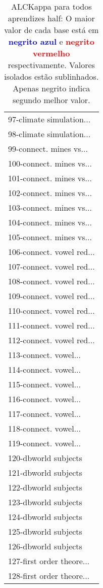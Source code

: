 \begin{table}[h]
\caption{ALCKappa para todos aprendizes half: O maior valor de cada base está em \textcolor{blue}{\textbf{negrito azul}} e \textcolor{red}{\textbf{negrito vermelho}} respectivamente. Valores isolados estão sublinhados. Apenas negrito indica segundo melhor valor.}
\begin{center}\begin{tabular}{l}
 & \\ \hline 97-climate simulation... &  \\
98-climate simulation... &  \\
99-connect. mines vs... &  \\
100-connect. mines vs... &  \\
101-connect. mines vs... &  \\
102-connect. mines vs... &  \\
103-connect. mines vs... &  \\ \hline
104-connect. mines vs... &  \\
105-connect. mines vs... &  \\
106-connect. vowel red... &  \\
107-connect. vowel red... &  \\
108-connect. vowel red... &  \\
109-connect. vowel red... &  \\
110-connect. vowel red... &  \\ \hline
111-connect. vowel red... &  \\
112-connect. vowel red... &  \\
113-connect. vowel... &  \\
114-connect. vowel... &  \\
115-connect. vowel... &  \\
116-connect. vowel... &  \\
117-connect. vowel... &  \\ \hline
118-connect. vowel... &  \\
119-connect. vowel... &  \\
120-dbworld subjects &  \\
121-dbworld subjects &  \\
122-dbworld subjects &  \\
123-dbworld subjects &  \\
124-dbworld subjects &  \\ \hline
125-dbworld subjects &  \\
126-dbworld subjects &  \\
127-first order theore... &  \\
128-first order theore... &  \\\end{tabular}\label{stratsALCKappa3AllReduxb}
\end{center}
\end{table}
